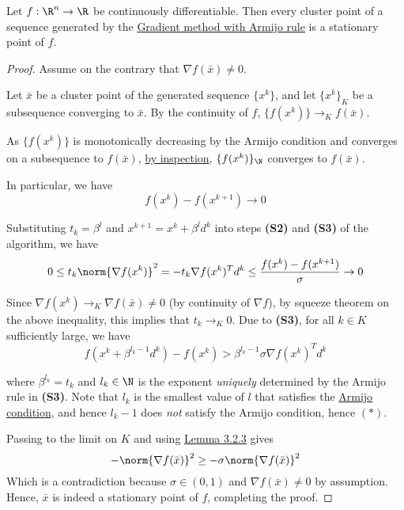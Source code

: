 \label{bbb25cd}

Let $f:\R^n\to\R$ be continuously differentiable. Then every cluster
point of a sequence generated by the \href{ae01f6d}{Gradient method
	with Armijo rule} is a stationary point of $f$.

\begin{proof}
	\def\xk{\{x^k\}}
	\def\grad#1{\nabla f(#1)}
	Assume on the contrary that $\grad{\bar x}\neq0$.

	Let $\bar x$ be a cluster point of the generated sequence $\xk$, and
	let $\xk_K$ be a subsequence converging to $\bar x$. By the
	continuity of $f$, $\{f(x^k)\}\to_Kf(\bar x)$.

	As $\{f(x^k)\}$ is monotonically decreasing by the Armijo condition
	and converges on a subsequence to $f(\bar x)$, \href{aaf3ba6}{by
		inspection}, $\{f(x^k)\}_\N$ converges to $f(\bar x)$.

	In particular, we have
	$$f(x^k)-f(x^{k+1})\to0$$

	Substituting $t_k=\beta^l$ and $x^{k+1}=x^k+\beta^ld^k$ into steps
	\textbf{(S2)} and \textbf{(S3)} of the algorithm, we have
	$$
		0\leq
		t_k\norm{\grad{x^k}}^2=
		-t_k\grad{x^k}^Td^k\leq
		\frac{f(x^k)-f(x^{k+1})}\sigma\to0
	$$

	Since $\grad{x^k}\to_K\grad{\bar x}\neq0$ (by continuity of $\nabla
		f$), by squeeze theorem on the above inequality, this implies that
	$t_k\to_K0$. Due to \textbf{(S3)}, for all $k\in K$ sufficiently
	large, we have
	\begin{equation}
		f(x^k+\beta^{l_k-1}d^k)-f(x^k)>\beta^{l_k-1}\sigma\grad{x^k}^Td^k\tag*{($*$)}
	\end{equation}

	where $\beta^{l_k}=t_k$ and $l_k\in\N$ is the exponent
	\textit{uniquely} determined by the Armijo rule in \textbf{(S3)}.
	Note that $l_k$ is the smallest value of $l$ that satisfies the
	\href{fefb024}{Armijo condition}, and hence $l_k-1$ does \textit{not}
	satisfy the Armijo condition, hence $(*)$.

	Passing to the limit on $K$ and using \href{f8e1f12}{Lemma 3.2.3}
	gives
	$$
		-\norm{\nabla f(\bar x)}^2\geq-\sigma\norm{\nabla f(\bar x)}^2
	$$
	Which is a contradiction because $\sigma\in(0,1)$ and $\nabla f(\bar
		x)\neq0$ by assumption. Hence, $\bar x$ is indeed a stationary point
	of $f$, completing the proof.
\end{proof}

\label{a66db73}


